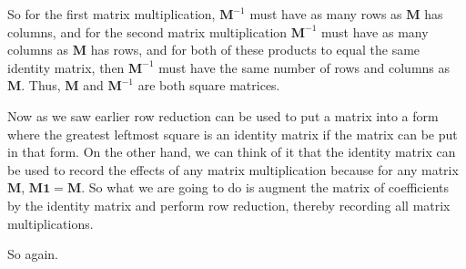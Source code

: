 \documentclass{article}
\begin{document}
So for the first matrix multiplication, $\mathbf{M}^{-1}$ must have as many rows as $\mathbf{M}$ has columns,
and for the second matrix multiplication $\mathbf{M}^{-1}$ must have as many columns as $\mathbf{M}$ has rows,
and for both of these products to equal the same identity matrix, then $\mathbf{M}^{-1}$ must have the same number of rows and columns as $\mathbf{M}$.
Thus, $\mathbf{M}$ and $\mathbf{M}^{-1}$ are both square matrices.

Now as we saw earlier row reduction can be used to put a matrix into a form where the greatest leftmost square is an identity matrix if the matrix can be put in that form.
On the other hand, we can think of it that the identity matrix can be used to record the effects of any matrix multiplication because for any matrix $\mathbf{M}$, $\mathbf{M1} = \mathbf{M}$.
So what we are going to do is augment the matrix of coefficients by the identity matrix and perform row reduction, thereby recording all matrix multiplications.

So again.
\end{document}
